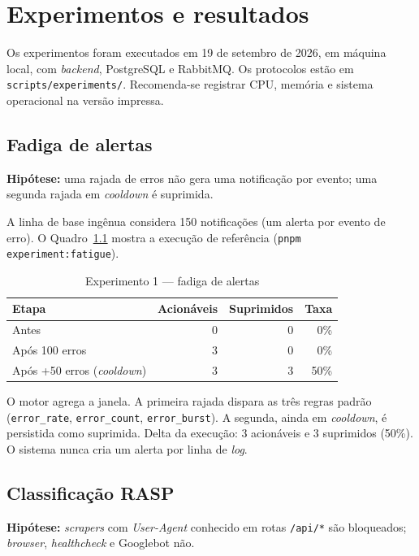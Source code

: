 \documentclass[
  12pt,
  oneside,
  a4paper,
  english,
  brazil,
  sumario=tradicional
]{abntex2}
\begin{document}
\chapter{Experimentos e resultados}
\label{cap:experimentos}

Os experimentos foram executados em 19 de setembro de 2026, em máquina local, com \textit{backend}, PostgreSQL e RabbitMQ. Os protocolos estão em \texttt{scripts/experiments/}. Recomenda-se registrar CPU, memória e sistema operacional na versão impressa.

\section{Fadiga de alertas}

\textbf{Hipótese:} uma rajada de erros não gera uma notificação por evento; uma segunda rajada em \textit{cooldown} é suprimida.

A linha de base ingênua considera 150 notificações (um alerta por evento de erro). O Quadro~\ref{tab:fadiga} mostra a execução de referência (\texttt{pnpm experiment:fatigue}).

\begin{table}[htbp]
\caption{Experimento 1 --- fadiga de alertas}
\label{tab:fadiga}
\centering
\begin{tabular}{@{}lrrr@{}}
\toprule
\textbf{Etapa} & \textbf{Acionáveis} & \textbf{Suprimidos} & \textbf{Taxa} \\
\midrule
Antes & 0 & 0 & 0\% \\
Após 100 erros & 3 & 0 & 0\% \\
Após +50 erros (\textit{cooldown}) & 3 & 3 & 50\% \\
\bottomrule
\end{tabular}
\end{table}

O motor agrega a janela. A primeira rajada dispara as três regras padrão (\texttt{error\_rate}, \texttt{error\_count}, \texttt{error\_burst}). A segunda, ainda em \textit{cooldown}, é persistida como suprimida. Delta da execução: 3 acionáveis e 3 suprimidos (50\%). O sistema nunca cria um alerta por linha de \textit{log}.

\section{Classificação RASP}

\textbf{Hipótese:} \textit{scrapers} com \textit{User-Agent} conhecido em rotas \texttt{/api/*} são bloqueados; \textit{browser}, \textit{healthcheck} e Googlebot não.
\end{document}
